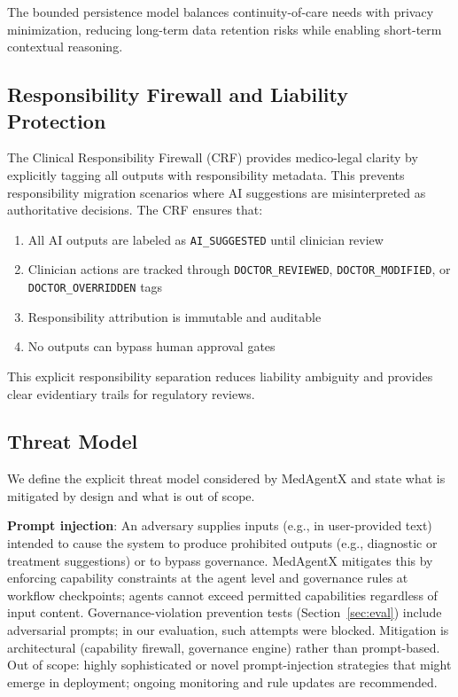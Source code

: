 \documentclass[journal]{IEEEtran}
\begin{document}
The bounded persistence model balances continuity-of-care needs with privacy minimization, reducing long-term data retention risks while enabling short-term contextual reasoning.

\subsection{Responsibility Firewall and Liability Protection}
The Clinical Responsibility Firewall (CRF) provides medico-legal clarity by explicitly tagging all outputs with responsibility metadata. This prevents responsibility migration scenarios where AI suggestions are misinterpreted as authoritative decisions. The CRF ensures that:

\begin{enumerate}
    \item All AI outputs are labeled as \texttt{AI\_SUGGESTED} until clinician review
    \item Clinician actions are tracked through \texttt{DOCTOR\_REVIEWED}, \texttt{DOCTOR\_MODIFIED}, or \texttt{DOCTOR\_OVERRIDDEN} tags
    \item Responsibility attribution is immutable and auditable
    \item No outputs can bypass human approval gates
\end{enumerate}

This explicit responsibility separation reduces liability ambiguity and provides clear evidentiary trails for regulatory reviews.

\subsection{Threat Model}
We define the explicit threat model considered by MedAgentX and state what is mitigated by design and what is out of scope.

\textbf{Prompt injection}: An adversary supplies inputs (e.g., in user-provided text) intended to cause the system to produce prohibited outputs (e.g., diagnostic or treatment suggestions) or to bypass governance. MedAgentX mitigates this by enforcing capability constraints at the agent level and governance rules at workflow checkpoints; agents cannot exceed permitted capabilities regardless of input content. Governance-violation prevention tests (Section~\ref{sec:eval}) include adversarial prompts; in our evaluation, such attempts were blocked. Mitigation is architectural (capability firewall, governance engine) rather than prompt-based. Out of scope: highly sophisticated or novel prompt-injection strategies that might emerge in deployment; ongoing monitoring and rule updates are recommended.
\end{document}
